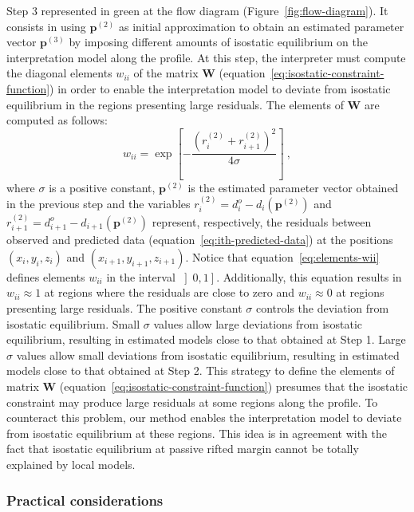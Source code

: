 \documentclass[manuscript,revised]{geophysics}
\begin{document}
Step 3 represented in green at the flow diagram (Figure~\ref{fig:flow-diagram}). 
It consists in using $\mathbf{p}^{(2)}$ as initial 
approximation to obtain an estimated parameter vector $\mathbf{p}^{(3)}$
by imposing different amounts of isostatic equilibrium on the interpretation model along the
profile. At this step, the interpreter must compute the diagonal elements 
$w_{ii}$ of the matrix $\mathbf{W}$ (equation~\ref{eq:isostatic-constraint-function}) 
in order to enable the interpretation model to deviate from isostatic equilibrium in 
the regions presenting large residuals. 
The elements of $\mathbf{W}$ are computed as follows:
\begin{equation} \label{eq:elements-wii}
w_{ii} = 
\exp \left[ - \frac{ \left( r_{i}^{(2)} + r_{i+1}^{(2)} \right)^{2}}{4 \sigma} \right] \: ,
\end{equation}
where $\sigma$ is a positive constant, $\mathbf{p}^{(2)}$ is the estimated parameter vector
obtained in the previous step and the variables
$r_{i}^{(2)} = d^{o}_{i} - d_{i} \left( \mathbf{p}^{(2)} \right)$ and 
$r_{i+1}^{(2)} = d^{o}_{i+1} - d_{i+1} \left(\mathbf{p}^{(2)} \right)$ represent,
respectively, the residuals between observed and predicted data
(equation~\ref{eq:ith-predicted-data}) at the positions $(x_{i}, y_{i}, z_{i})$ and 
$(x_{i+1}, y_{i+1}, z_{i+1})$. Notice that equation~\ref{eq:elements-wii} defines elements 
$w_{ii}$ in the interval $\left] 0, 1 \right]$. Additionally, this equation results in 
$w_{ii} \approx 1$ at regions where the residuals are close to zero and 
$w_{ii} \approx 0$ at regions presenting large residuals.
The positive constant $\sigma$ controls the deviation from isostatic equilibrium.
Small $\sigma$ values allow large deviations from isostatic equilibrium,
resulting in estimated models close to that obtained at Step 1.
Large $\sigma$ values allow small deviations from isostatic equilibrium,
resulting in estimated models close to that obtained at Step 2.
This strategy to define the elements of matrix $\mathbf{W}$ 
(equation~\ref{eq:isostatic-constraint-function}) presumes that the isostatic constraint may
produce large residuals at some regions along the profile. To counteract this problem,
our method enables the interpretation model to deviate from isostatic equilibrium at these 
regions. This idea is in agreement with the fact that isostatic equilibrium at 
passive rifted margin cannot be totally explained by local models.

\subsubsection*{Practical considerations}
\end{document}
